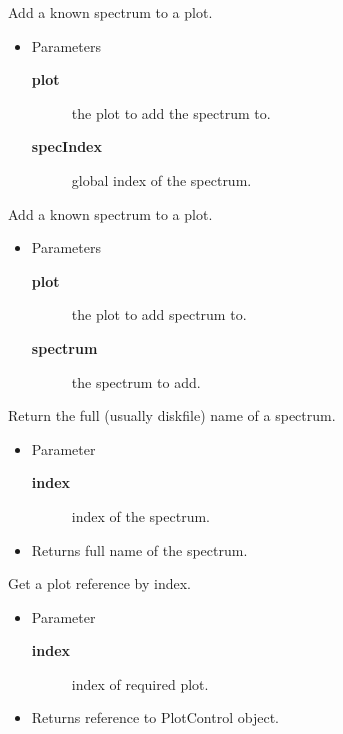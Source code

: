\begin{desc}Add a known spectrum to a plot.
\begin{itemize}
\item{Parameters
  \begin{description}
   \item[\textbf{plot}]{the plot to add the spectrum to.}
   \item[\textbf{specIndex}]{global index of the spectrum.}
  \end{description}}
\end{itemize}
\end{desc}

\begin{desc}Add a known spectrum to a plot.
\begin{itemize}
\item{Parameters
  \begin{description}
   \item[\textbf{plot}]{the plot to add spectrum to.}
   \item[\textbf{spectrum}]{the spectrum to add.}
  \end{description}}
\end{itemize}
\end{desc}

\begin{desc}Return the full (usually diskfile) name of a spectrum.
\begin{itemize}
\item{Parameter
  \begin{description}
   \item[\textbf{index}]{index of the spectrum.}
  \end{description}}
\end{itemize}
\begin{itemize}
\item{Returns full name of the spectrum. }
\end{itemize}
\end{desc}

\begin{desc}Get a plot reference by index.
\begin{itemize}
\item{Parameter
  \begin{description}
   \item[\textbf{index}]{index of required plot.}
  \end{description}}
\end{itemize}
\begin{itemize}
\item{Returns reference to PlotControl object. }
\end{itemize}
\end{desc}

